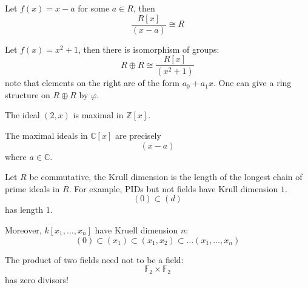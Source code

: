 \documentclass[openany]{book}
\newcommand{\Z}{\mathbb{Z}}
\newcommand{\C}{\mathbb{C}}
\newcommand{\F}{\mathbb{F}}
\begin{document}
\begin{example}
    Let $f(x)=x-a$ for some $a\in R$, then 
    \begin{equation*}
        \frac{R[x]}{(x-a)}\cong R
    \end{equation*}
\end{example}
\begin{example}
    Let $f(x)=x^2+1$, then there is isomorphism of groups:
    \begin{equation*}
        R\oplus R\cong\frac{R[x]}{(x^2+1)}
    \end{equation*}
    note that elements on the right are of the form $a_0+a_1x$. One can give a ring structure on $R\oplus R$ by $\varphi$.
\end{example}

\begin{example}
    The ideal $(2,x)$ is maximal in $\Z[x]$.
\end{example}

\begin{example}
    The maximal ideals in $\C[x]$ are precisely 
    \begin{equation*}
        (x-a)
    \end{equation*}
    where $a\in\C$.
\end{example}

\begin{defn}
    Let $R$ be commutative, the Krull dimension is the length of the longest chain of prime ideals in $R$. For example, PIDs but not fields have Krull dimension $1$. 
    \begin{equation*}
        (0)\subset (d)
    \end{equation*}
    has length $1$.

    Moreover, $k[x_1,\dots,x_n]$ have Kruell dimension $n$:
    \begin{equation*}
        (0)\subset (x_1)\subset(x_1,x_2)\subset\dots(x_1,\dots,x_n)
    \end{equation*}
\end{defn}

\begin{prop}
    The product of two fields need not to be a field:
    \begin{equation*}
        \F_2\times\F_2
    \end{equation*}
    has zero divisors!
\end{prop}
\end{document}
